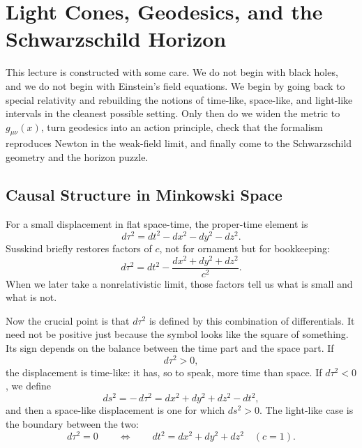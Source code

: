 \chapter{Light Cones, Geodesics, and the Schwarzschild Horizon}

This lecture is constructed with some care. We do not begin with black holes, and we do not begin with Einstein's field equations. We begin by going back to special relativity and rebuilding the notions of time-like, space-like, and light-like intervals in the cleanest possible setting. Only then do we widen the metric to \(g_{\mu\nu}(x)\), turn geodesics into an action principle, check that the formalism reproduces Newton in the weak-field limit, and finally come to the Schwarzschild geometry and the horizon puzzle.

\section{Causal Structure in Minkowski Space}

For a small displacement in flat space-time, the proper-time element is
\begin{equation}
d\tau^2 = dt^2 - dx^2 - dy^2 - dz^2.
\end{equation}
Susskind briefly restores factors of \(c\), not for ornament but for bookkeeping:
\begin{equation}
d\tau^2 = dt^2 - \frac{dx^2+dy^2+dz^2}{c^2}.
\end{equation}
When we later take a nonrelativistic limit, those factors tell us what is small and what is not.

Now the crucial point is that \(d\tau^2\) is defined by this combination of differentials. It need not be positive just because the symbol looks like the square of something. Its sign depends on the balance between the time part and the space part. If
\begin{equation}
d\tau^2 > 0,
\end{equation}
the displacement is time-like: it has, so to speak, more time than space. If \(d\tau^2<0\), we define
\begin{equation}
ds^2 = -\,d\tau^2 = dx^2+dy^2+dz^2-dt^2,
\end{equation}
and then a space-like displacement is one for which \(ds^2>0\). The light-like case is the boundary between the two:
\begin{equation}
d\tau^2 = 0
\qquad\Longleftrightarrow\qquad
dt^2 = dx^2+dy^2+dz^2
\quad (c=1).
\end{equation}

